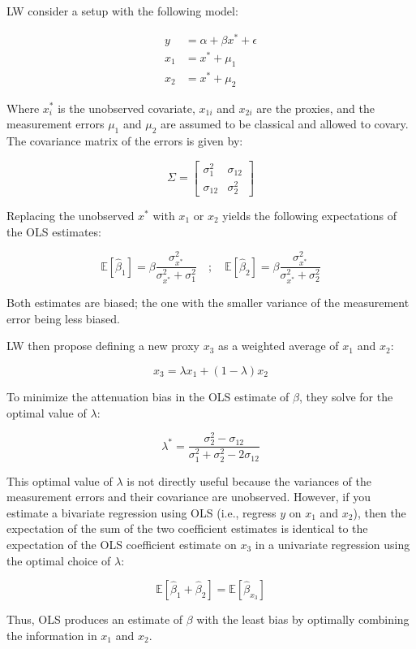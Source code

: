 LW consider a setup with the following model:

\begin{align*}
    y &= \alpha + \beta x^* + \epsilon \\
    x_1 &= x^* + \mu_1 \\
    x_2 &= x^* + \mu_2
\end{align*}

Where \(x_{i}^{*}\) is the unobserved covariate, \(x_{1i}\) and \(x_{2i}\) are the proxies, and the measurement errors \(\mu_1\) and \(\mu_2\) are assumed to be classical and allowed to covary. The covariance matrix of the errors is given by:

\[
\Sigma = \begin{bmatrix}
    \sigma_1^2 & \sigma_{12} \\
    \sigma_{12} & \sigma_2^2
\end{bmatrix}
\]

Replacing the unobserved \(x^*\) with \(x_1\) or \(x_2\) yields the following expectations of the OLS estimates:

\[
\mathbb{E} \left[ \hat{\beta}_1 \right] = \beta \frac{\sigma_{x^*}^2}{\sigma_{x^*}^2 + \sigma_1^2} \quad ; \quad \mathbb{E} \left[ \hat{\beta}_2 \right] = \beta \frac{\sigma_{x^*}^2}{\sigma_{x^*}^2 + \sigma_2^2}
\]

Both estimates are biased; the one with the smaller variance of the measurement error being less biased.

LW then propose defining a new proxy \(x_3\) as a weighted average of \(x_1\) and \(x_2\):

\[
x_3 = \lambda x_1 + (1 - \lambda) x_2
\]

To minimize the attenuation bias in the OLS estimate of \(\beta\), they solve for the optimal value of \(\lambda\):

\[
\lambda^* = \frac{\sigma_2^2 - \sigma_{12}}{\sigma_1^2 + \sigma_2^2 - 2\sigma_{12}}
\]

This optimal value of \(\lambda\) is not directly useful because the variances of the measurement errors and their covariance are unobserved. However, if you estimate a bivariate regression using OLS (i.e., regress \(y\) on \(x_1\) and \(x_2\)), then the expectation of the sum of the two coefficient estimates is identical to the expectation of the OLS coefficient estimate on \(x_3\) in a univariate regression using the optimal choice of \(\lambda\):

\[
\mathbb{E} \left[ \hat{\beta}_1 + \hat{\beta}_2 \right] = \mathbb{E} \left[ \hat{\beta}_{x_3} \right]
\]

Thus, OLS produces an estimate of \(\beta\) with the least bias by optimally combining the information in \(x_1\) and \(x_2\).
